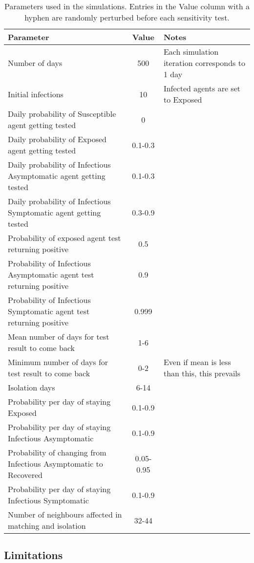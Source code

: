 \documentclass{article}
\begin{document}
\begin{table}[h!]
\begin{tabular}{|p{7cm}|c|p{7cm}|}
  \hline
Parameter	&Value	&Notes\\ \hline
Number of days	& 500	&Each simulation iteration corresponds to 1 day\\ \hline
Initial infections	& 10	&Infected agents are set to Exposed\\ \hline
Daily probability of Susceptible agent getting tested	& 0	&\\ \hline
Daily probability of Exposed agent getting tested 	& 0.1-0.3	&\\ \hline
Daily probability of Infectious Asymptomatic agent getting tested	&0.1-0.3	&\\ \hline
Daily probability of Infectious Symptomatic agent getting tested	& 0.3-0.9	&\\ \hline
Probability of exposed agent test returning positive	& 0.5	&\\ \hline
Probability of Infectious Asymptomatic agent test returning positive	& 0.9	&\\ \hline
Probability of Infectious Symptomatic agent test returning positive	& 0.999	&\\ \hline
Mean number of days for test result to come back	& 1-6	&\\ \hline
Minimum number of days for test result to come back	& 0-2	&Even if mean is less than this, this prevails\\ \hline
Isolation days	& 6-14	&\\ \hline
Probability per day of staying Exposed	& 0.1-0.9	&\\ \hline
Probability per day of staying Infectious Asymptomatic	& 0.1-0.9	&\\ \hline
Probability of changing from Infectious Asymptomatic to Recovered	& 0.05-0.95	&\\ \hline
Probability per day of staying Infectious Symptomatic	& 0.1-0.9	&\\ \hline
Number of neighbours affected in matching and isolation	& 32-44	&\\
\hline
\end{tabular}
\caption{Parameters used in the simulations. Entries in the Value column with a
  hyphen are randomly perturbed before each sensitivity test.}
\label{table:parameters}
\end{table}

\subsection{Limitations}
\end{document}
